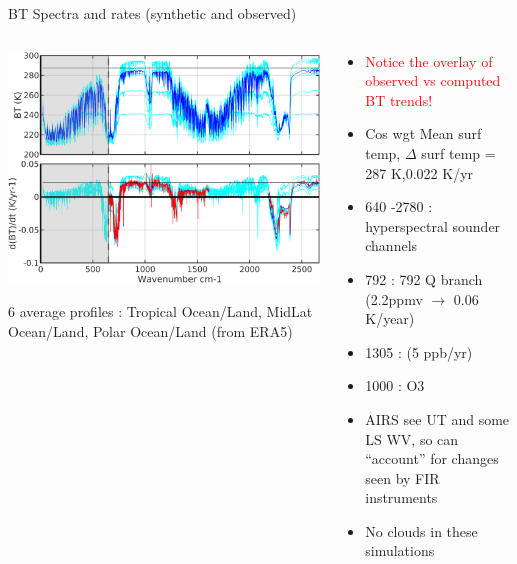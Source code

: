 \documentclass[10pt,t]{beamer}
\begin{document}
\begin{frame}{BT Spectra and rates (synthetic and observed)}

\vspace{-0.1in}
\begin{columns}

\begin{column}{0.55\columnwidth}
\begin{center}
\includegraphics[width=0.9\linewidth]{NEWFIGS/kcarta_0_3000__bttrends.png}
\end{center}
6 average profiles : Tropical Ocean/Land, MidLat Ocean/Land, Polar Ocean/Land (from ERA5)
\end{column}

\begin{column}{0.55\columnwidth}
\begin{itemize}
  \item \textcolor{red}{Notice the overlay of observed vs computed BT trends!}
  \item Cos wgt Mean surf temp, $\Delta$ surf temp = 287 K,0.022 K/yr
  \item 640 -2780 \wn : hyperspectral sounder channels
  \item 792 \wn : 792 \cd Q branch (2.2ppmv $\rightarrow$ 0.06 K/year)
  \item 1305 \wn : \methane (5 ppb/yr)
  \item 1000 \wn : O3
  \item AIRS see UT and some LS WV, so can ``account'' for changes seen by FIR instruments
  \item No clouds in these simulations
\end{itemize}
\end{column}
\end{columns}
\end{frame}
\end{document}

